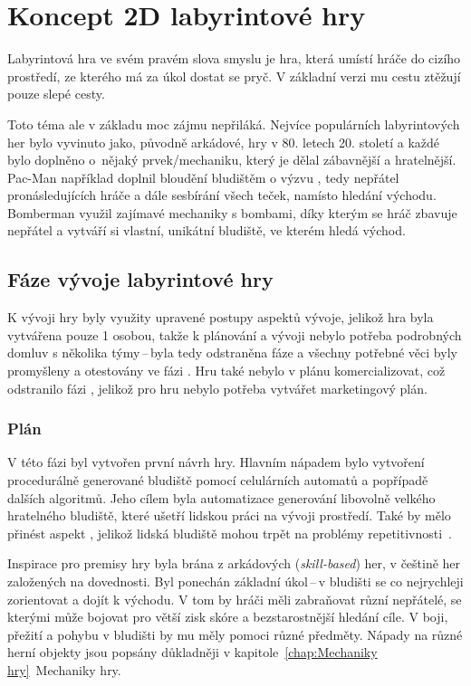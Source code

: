 \chapter{Koncept 2D labyrintové hry}
Labyrintová hra ve svém pravém slova smyslu je hra, která umístí hráče do cizího prostředí, ze kterého má za úkol dostat se pryč. V základní verzi mu cestu ztěžují pouze slepé cesty. 

Toto téma ale v základu moc zájmu nepřiláká. Nejvíce populárních labyrintových her bylo vyvinuto jako, původně arkádové, hry v 80. letech 20. století a každé bylo doplněno o~nějaký prvek/mechaniku, který je dělal zábavnější a hratelnější. Pac-Man například doplnil bloudění bludištěm o výzvu , tedy nepřátel pronásledujících hráče a dále sesbírání všech teček, namísto hledání východu. Bomberman využil zajímavé mechaniky s bombami, díky kterým se hráč zbavuje nepřátel a vytváří si vlastní, unikátní bludiště, ve kterém hledá východ.

\section{Fáze vývoje labyrintové hry}
K vývoji hry byly využity upravené postupy aspektů vývoje, jelikož hra byla vytvářena pouze 1 osobou, takže k plánování a vývoji nebylo potřeba podrobných domluv s několika týmy\,--\,byla tedy odstraněna fáze  a všechny potřebné věci byly promyšleny a otestovány ve fázi . Hru také nebylo v plánu komercializovat, což odstranilo fázi , jelikož pro hru nebylo potřeba vytvářet marketingový plán.

\subsection*{Plán}
V této fázi byl vytvořen první návrh hry. Hlavním nápadem bylo vytvoření procedurálně generované bludiště pomocí celulárních automatů a popřípadě dalších algoritmů. Jeho cílem byla automatizace generování libovolně velkého hratelného bludiště, které ušetří lidskou práci na vývoji prostředí. Také by mělo přinést aspekt , jelikož lidská bludiště mohou trpět na problémy repetitivnosti~\cite{Procedural_Game_Map}.

Inspirace pro premisy hry byla brána z arkádových (\textit{skill-based}) her, v češtině her založených na dovednosti. Byl ponechán základní úkol\,--\,v bludišti se co nejrychleji zorientovat a dojít k východu. V tom by hráči měli zabraňovat různí nepřátelé, se kterými může bojovat pro větší zisk skóre a bezstarostnější hledání cíle. V boji, přežití a pohybu v bludišti  by mu měly pomoci různé předměty. Nápady na různé herní objekty jsou popsány důkladněji v kapitole~\ref{chap:Mechaniky hry}~Mechaniky hry.

